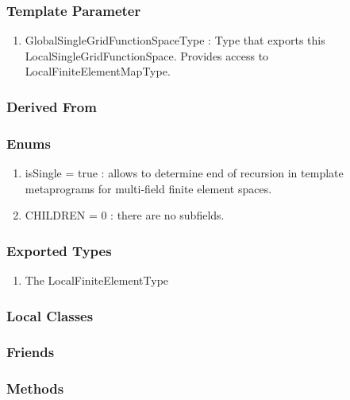 \documentclass[11pt,a4paper,DIV11,%
notitlepage,oneside,abstracton,%
bibtotoc]{scrartcl}
\begin{document}
\subsubsection{Template Parameter}

\begin{enumerate}[1)]
\item GlobalSingleGridFunctionSpaceType : Type that exports this
  LocalSingleGridFunctionSpace. Provides access to LocalFiniteElementMapType.
\end{enumerate}

\subsubsection{Derived From}

\subsubsection{Enums}

\begin{enumerate}[1)]
\item isSingle = true : allows to determine end of recursion in
  template metaprograms for multi-field finite element spaces.
\item CHILDREN = 0 : there are no subfields.
\end{enumerate}

\subsubsection{Exported Types}

\begin{enumerate}[1)]
\item The LocalFiniteElementType
\end{enumerate}

\subsubsection{Local Classes}

\subsubsection{Friends}

\subsubsection{Methods}
\end{document}
